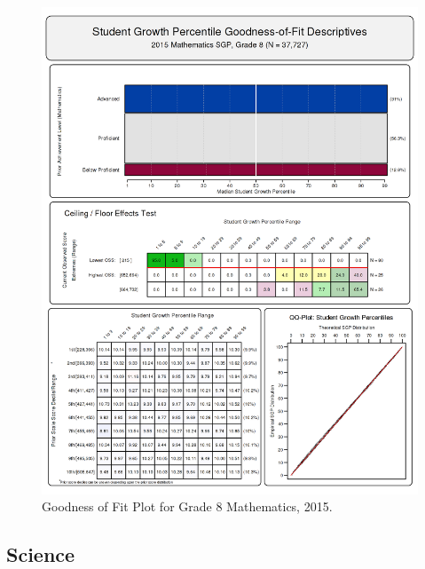 \documentclass[12pt]{article}
\begin{document}
\begin{figure}[htbp]
\centering
\includegraphics{../img/Goodness_of_Fit/MATHEMATICS.2015/2015_MATH_8;2014_MATH_7;2013_MATH_6;2012_MATH_5;2011_MATH_4;2010_MATH_3.png}
\caption{Goodness of Fit Plot for Grade 8 Mathematics, 2015.}
\end{figure}

\clearpage 

\subsection{Science}\label{science}
\end{document}
